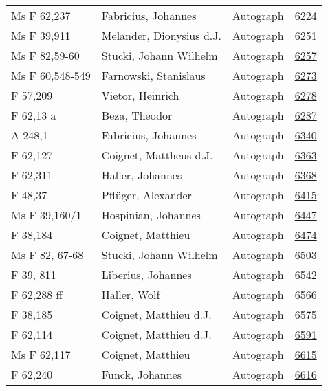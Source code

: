 \documentclass[10pt,a4paper,landscape]{report}
\begin{document}
\begin{longtable}{p{16cm}p{4cm}lr}
Ms F 62,237	&	Fabricius, Johannes	&	Autograph	&	\href{http://130.60.24.72/assignment/6224}{6224}\\
Ms F 39,911	&	Melander, Dionysius d.J.	&	Autograph	&	\href{http://130.60.24.72/assignment/6251}{6251}\\
Ms F 82,59-60	&	Stucki, Johann Wilhelm	&	Autograph	&	\href{http://130.60.24.72/assignment/6257}{6257}\\
Ms F 60,548-549	&	Farnowski, Stanislaus	&	Autograph	&	\href{http://130.60.24.72/assignment/6273}{6273}\\
F 57,209	&	Vietor, Heinrich	&	Autograph	&	\href{http://130.60.24.72/assignment/6278}{6278}\\
F 62,13 a	&	Beza, Theodor	&	Autograph	&	\href{http://130.60.24.72/assignment/6287}{6287}\\
A 248,1	&	Fabricius, Johannes	&	Autograph	&	\href{http://130.60.24.72/assignment/6340}{6340}\\
F 62,127	&	Coignet, Mattheus d.J.	&	Autograph	&	\href{http://130.60.24.72/assignment/6363}{6363}\\
F 62,311	&	Haller, Johannes	&	Autograph	&	\href{http://130.60.24.72/assignment/6368}{6368}\\
F 48,37	&	Pflüger, Alexander	&	Autograph	&	\href{http://130.60.24.72/assignment/6415}{6415}\\
Ms F 39,160/1	&	Hospinian, Johannes	&	Autograph	&	\href{http://130.60.24.72/assignment/6447}{6447}\\
F 38,184	&	Coignet, Matthieu	&	Autograph	&	\href{http://130.60.24.72/assignment/6474}{6474}\\
Ms F 82, 67-68	&	Stucki, Johann Wilhelm	&	Autograph	&	\href{http://130.60.24.72/assignment/6503}{6503}\\
F 39, 811	&	Liberius, Johannes	&	Autograph	&	\href{http://130.60.24.72/assignment/6542}{6542}\\
F 62,288 ff	&	Haller, Wolf	&	Autograph	&	\href{http://130.60.24.72/assignment/6566}{6566}\\
F 38,185	&	Coignet, Matthieu d.J.	&	Autograph	&	\href{http://130.60.24.72/assignment/6575}{6575}\\
F 62,114	&	Coignet, Matthieu d.J.	&	Autograph	&	\href{http://130.60.24.72/assignment/6591}{6591}\\
Ms F 62,117	&	Coignet, Matthieu	&	Autograph	&	\href{http://130.60.24.72/assignment/6615}{6615}\\
F 62,240	&	Funck, Johannes	&	Autograph	&	\href{http://130.60.24.72/assignment/6616}{6616}\\

\end{longtable}
\end{document}
